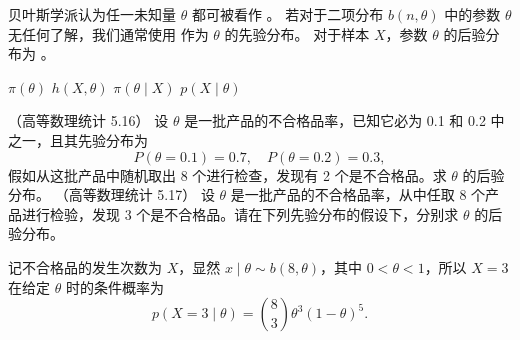 \documentclass[answers]{exam}
\begin{document}
\begin{questions}
    \question
    贝叶斯学派认为任一未知量 $\theta$ 都可被看作 \fillin[随机变量]。
    \question 若对于二项分布 $b\left(n,\theta\right)$ 中的参数 $\theta$ 无任何了解，我们通常使用  作为 $\theta$ 的先验分布。
    \question
    对于样本 $X$，参数 $\theta$ 的后验分布为 \fillin[C]。\par
    \begin{oneparchoices}
        \choice $\pi(\theta)$
        \choice $h\left(X,\theta\right)$
        \CorrectChoice $\pi\left(\theta\mid X\right)$
        \choice $p(X\mid\theta)$
    \end{oneparchoices}
    \question
    （高等数理统计 5.16）
    设 $\theta$ 是一批产品的不合格品率，已知它必为 0.1 和 0.2 中之一，且其先验分布为
    \begin{equation*}
        P\left(\theta=0.1\right)=0.7,\quad P\left(\theta=0.2\right)=0.3,
    \end{equation*}
    假如从这批产品中随机取出 8 个进行检查，发现有 2 个是不合格品。求 $\theta$ 的后验分布。
    \question
    （高等数理统计 5.17）
    设 $\theta$ 是一批产品的不合格品率，从中任取 8 个产品进行检验，发现 3 个是不合格品。请在下列先验分布的假设下，分别求 $\theta$ 的后验分布。
    \begin{solution}
        记不合格品的发生次数为 $X$，显然 $x\mid\theta\sim b(8,\theta)$，其中 $0<\theta<1$，所以 $X=3$ 在给定 $\theta$ 时的条件概率为
        \begin{equation*}
            p\left(X=3\mid\theta\right)=\binom{8}{3}\theta^3\left(1-\theta\right)^5.
        \end{equation*}
        \begin{parts}

\end{parts}
\end{solution}
\end{questions}
\end{document}
